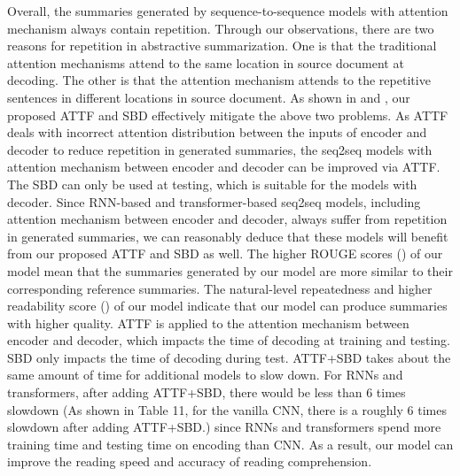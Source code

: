 Overall, the summaries generated by sequence-to-sequence models with attention mechanism always contain repetition.  
Through our observations, there are two reasons for repetition in abstractive summarization.
One is that the traditional attention mechanisms attend to the same location in source document at decoding.
The other is that the attention mechanism attends to the repetitive sentences in different locations in source document. 
As shown in  and ,
our proposed ATTF and SBD effectively mitigate the above two problems.  
As ATTF deals with incorrect attention distribution
between the inputs of encoder and decoder to 
reduce repetition in generated summaries,
the seq2seq models with attention mechanism between encoder and decoder
can be improved via ATTF.
The SBD can only be used at testing, which is suitable for the models with decoder.
Since RNN-based and transformer-based seq2seq models,
including attention mechanism between encoder and decoder,
always suffer from repetition in generated summaries, 
we can reasonably deduce that these models will benefit from our proposed ATTF and SBD as well.
The higher ROUGE scores () of our model mean that
the summaries generated by our model are more similar to their corresponding reference summaries.
The natural-level repeatedness and higher readability score () of our model indicate 
that our model can produce summaries with higher quality.
ATTF is applied to the attention mechanism between encoder and decoder,
which impacts the time of decoding at training and testing.
SBD only impacts the time of decoding during test.
ATTF+SBD takes about the same amount of time for additional models to slow down.
For RNNs and transformers, after adding ATTF+SBD,
there would be less than 6 times slowdown
(As shown in Table 11, for the vanilla CNN, there is a roughly 6 times slowdown after adding ATTF+SBD.)
since RNNs and transformers spend more training time and testing time on encoding than CNN.
As a result, our model can improve the reading speed and accuracy of reading comprehension.


